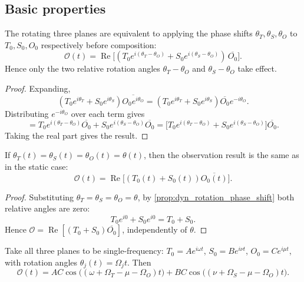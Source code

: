 \subsection{Basic properties}

\begin{proposition}\label{prop:dyn_rotation_phase_shift}
The rotating three planes are equivalent to applying the phase shifts $\theta_T,\theta_S,\theta_O$ to $T_0,S_0,O_0$ respectively before composition:
\[
\mathcal O(t)=\operatorname{Re}\!\big[(T_0 e^{i(\theta_T-\theta_O)}+S_0 e^{i(\theta_S-\theta_O)})\,\overline{O_0}\big].
\]
Hence only the two relative rotation angles $\theta_T-\theta_O$ and $\theta_S-\theta_O$ take effect.
\end{proposition}

\begin{proof}
Expanding,
\[
(T_0 e^{i\theta_T}+S_0 e^{i\theta_S})\overline{O_0 e^{i\theta_O}}
=(T_0 e^{i\theta_T}+S_0 e^{i\theta_S})\overline{O_0}e^{-i\theta_O}.
\]
Distributing $e^{-i\theta_O}$ over each term gives
\[
=T_0 e^{i(\theta_T-\theta_O)}\overline{O_0}+S_0 e^{i(\theta_S-\theta_O)}\overline{O_0}
=\big[T_0 e^{i(\theta_T-\theta_O)}+S_0 e^{i(\theta_S-\theta_O)}\big]\overline{O_0}.
\]
Taking the real part gives the result.
\end{proof}

\begin{theorem}\label{thm:dyn_sync_invariance}
If $\theta_T(t)=\theta_S(t)=\theta_O(t)=\theta(t)$, then the observation result is the same as in the static case:
\[
\mathcal O(t)=\operatorname{Re}\!\big[(T_0(t)+S_0(t))\overline{O_0(t)}\big].
\]
\end{theorem}

\begin{proof}
Substituting $\theta_T=\theta_S=\theta_O=\theta$, by \cref{prop:dyn_rotation_phase_shift} both relative angles are zero:
\[
T_0 e^{i0}+S_0 e^{i0}=T_0+S_0.
\]
Hence $\mathcal O=\operatorname{Re}[(T_0+S_0)\overline{O_0}]$, independently of $\theta$.
\end{proof}

\begin{corollary}\label{cor:dyn_async_beat}
Take all three planes to be single-frequency: $T_0=A e^{i\omega t}$, $S_0=B e^{i\nu t}$, $O_0=C e^{i\mu t}$, with rotation angles $\theta_j(t)=\Omega_j t$. Then
\[
\mathcal O(t)=AC\cos\big((\omega+\Omega_T-\mu-\Omega_O)t\big)+BC\cos\big((\nu+\Omega_S-\mu-\Omega_O)t\big).
\]
\end{corollary}

